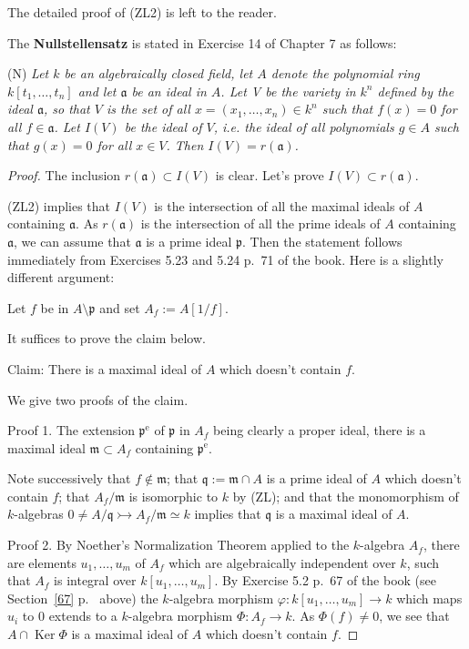 \documentclass[parskip=half,fontsize=12pt]{scrartcl}%
\newcommand{\oo}{\operatorname}\newcommand{\ooo}{\operatorname*}
\newcommand{\mf}{\mathfrak}
\newcommand{\ppp}{\mf p}
\newcommand{\mono}{\rightarrowtail}
\begin{document}
The detailed proof of (ZL2) is left to the reader.

The \textbf{Nullstellensatz} is stated in Exercise 14 of Chapter 7 as follows:

(N) \emph{Let $k$ be an algebraically closed field, let $A$ denote the polynomial ring $k[t_1,\dots,t_n]$ and let $\mf a$ be an ideal in $A$. Let V be the variety in $k^n$ defined by the ideal $\mf a$, so that $V$ is the set of all $x=(x_1,\dots,x_n)\in k^n$ such that $f(x)=0$ for all $f\in\mf a$. Let $I(V)$ be the ideal of $V$, i.e. the ideal of all polynomials $g\in A$ such that $g(x)=0$ for all $x\in V$. Then $I(V)=r(\mf a)$.}

\begin{proof} 
The inclusion $r(\mf a)\subset I(V)$ is clear. Let's prove $I(V)\subset r(\mf a)$. 

(ZL2) implies that $I(V)$ is the intersection of all the maximal ideals of $A$ containing $\mf a$. As $r(\mf a)$ is the intersection of all the prime ideals of $A$ containing $\mf a$, we can assume that $\mf a$ is a prime ideal $\ppp$. Then the statement follows immediately from Exercises 5.23 and 5.24 p.~71 of the book. Here is a slightly different argument:

Let $f$ be in $A\setminus\ppp$ and set $A_f:=A[1/f]$.

It suffices to prove the claim below.

Claim: There is a maximal ideal of $A$ which doesn't contain $f$. 

We give two proofs of the claim.

Proof 1. The extension $\ppp^{\oo e}$ of $\ppp$ in $A_f$ being clearly a proper ideal, there is a maximal ideal $\mf m\subset A_f$ containing $\ppp^{\oo e}$. 

Note successively that $f\notin\mf m$; that $\mf q:=\mf m\cap A$ is a prime ideal of $A$ which doesn't contain $f$; that $A_f/\mf m$ is isomorphic to $k$ by (ZL); and that the monomorphism of $k$-algebras $0\ne A/\mf q\mono A_f/\mf m\simeq k$ implies that $\mf q$ is a maximal ideal of $A$.

Proof 2. By Noether's Normalization Theorem applied to the $k$-algebra $A_f$, there are elements $u_1,\dots,u_m$ of $A_f$ which are algebraically independent over $k$, such that $A_f$ is integral over $k[u_1,\dots,u_m]$. By Exercise 5.2 %
p.~67 of the book (see Section~\ref{67} p.~\pageref{67} above) the $k$-algebra morphism $\varphi:k[u_1,\dots,u_m]\to k$ which maps $u_i$ to $0$ extends to a $k$-algebra morphism $\Phi:A_f\to k$. As $\Phi(f)\ne0$, we see that $A\cap\oo{Ker}\Phi$ is a maximal ideal of $A$ which doesn't contain $f$.
\end{proof}
\end{document}
